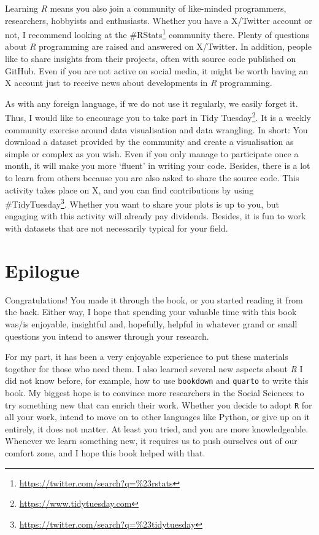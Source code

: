 \documentclass[
  letterpaper,
]{krantz}
\renewcommand{\href}[2]{#2\footnote{\url{#1}}}
\begin{document}
Learning \emph{R} means you also join a community of like-minded
programmers, researchers, hobbyists and enthusiasts. Whether you have a
X/Twitter account or not, I recommend looking at the
\href{https://twitter.com/search?q=\%23rstats}{\#RStats} community
there. Plenty of questions about \emph{R} programming are raised and
answered on X/Twitter. In addition, people like to share insights from
their projects, often with source code published on GitHub. Even if you
are not active on social media, it might be worth having an X account
just to receive news about developments in \emph{R} programming.

As with any foreign language, if we do not use it regularly, we easily
forget it. Thus, I would like to encourage you to take part in
\href{https://www.tidytuesday.com}{Tidy Tuesday}. It is a weekly
community exercise around data visualisation and data wrangling. In
short: You download a dataset provided by the community and create a
visualisation as simple or complex as you wish. Even if you only manage
to participate once a month, it will make you more `fluent' in writing
your code. Besides, there is a lot to learn from others because you are
also asked to share the source code. This activity takes place on X, and
you can find contributions by using
\href{https://twitter.com/search?q=\%23tidytuesday}{\#TidyTuesday}.
Whether you want to share your plots is up to you, but engaging with
this activity will already pay dividends. Besides, it is fun to work
with datasets that are not necessarily typical for your field.


\chapter*{Epilogue}\label{sec-epilogue}


Congratulations! You made it through the book, or you started reading it
from the back. Either way, I hope that spending your valuable time with
this book was/is enjoyable, insightful and, hopefully, helpful in
whatever grand or small questions you intend to answer through your
research.

For my part, it has been a very enjoyable experience to put these
materials together for those who need them. I also learned several new
aspects about \emph{R} I did not know before, for example, how to use
\texttt{bookdown} and \texttt{quarto} to write this book. My biggest
hope is to convince more researchers in the Social Sciences to try
something new that can enrich their work. Whether you decide to adopt
\texttt{R} for all your work, intend to move on to other languages like
Python, or give up on it entirely, it does not matter. At least you
tried, and you are more knowledgeable. Whenever we learn something new,
it requires us to push ourselves out of our comfort zone, and I hope
this book helped with that.
\end{document}
